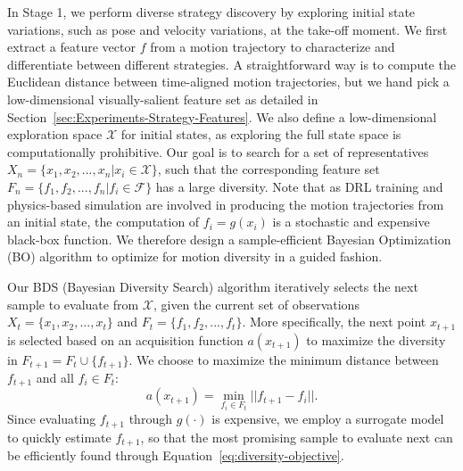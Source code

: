 In Stage 1, we perform diverse strategy discovery by exploring initial state variations, such as pose and velocity variations, at the take-off moment. We first extract a feature vector $f$ from a motion trajectory to characterize and differentiate between different strategies. A straightforward way is to compute the Euclidean distance between time-aligned motion trajectories, but we hand pick a low-dimensional visually-salient feature set as detailed in Section~\ref{sec:Experiments-Strategy-Features}. We also define a low-dimensional exploration space $\mathcal{X}$ for initial states, as exploring the full state space is computationally prohibitive. Our goal is to search for a set of representatives $X_n = \{x_1, x_2, ..., x_n | x_i \in \mathcal{X}\}$, such that the corresponding feature set $F_n= \{f_1, f_2, ..., f_n | f_i \in \mathcal{F}\}$ has a large diversity. Note that as DRL training and physics-based simulation are involved in producing the motion trajectories from an initial state, the computation of $f_i=g(x_i)$ is a stochastic and expensive black-box function. We therefore design a sample-efficient Bayesian Optimization (BO) algorithm to optimize for motion diversity in a guided fashion.

Our BDS (Bayesian Diversity Search) algorithm iteratively selects the next sample to evaluate from $\mathcal{X}$, given the current set of observations $X_t = \{x_1, x_2, ..., x_t\}$ and $F_t = \{f_1, f_2, ..., f_t\}$. More specifically, the next point $x_{t+1}$ is selected based on an acquisition function $a(x_{t+1})$ to maximize the diversity in $F_{t+1}=F_t \cup \{f_{t+1}\}$. We choose to maximize the minimum distance between $f_{t+1}$ and all $f_i \in F_t$:
\begin{equation}\label{eq:diversity-objective}
    a(x_{t+1}) = \min_{f_i \in F_t}{||f_{t+1} - f_i||} .
\end{equation}
Since evaluating $f_{t+1}$ through $g(\cdot)$ is expensive, we employ a surrogate model to quickly estimate $f_{t+1}$, so that the most promising sample to evaluate next can be efficiently found through Equation~\ref{eq:diversity-objective}.

